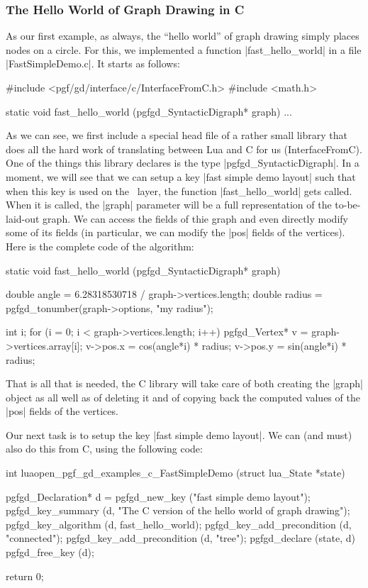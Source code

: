 \subsubsection{The Hello World of Graph Drawing in C}

As our first example, as always, the ``hello world'' of graph drawing
simply places nodes on a circle. For this, we implemented a
function |fast_hello_world| in a file |FastSimpleDemo.c|. It starts as
follows:

\begin{codeexample}
#include <pgf/gd/interface/c/InterfaceFromC.h>
#include <math.h>

static void fast_hello_world (pgfgd_SyntacticDigraph* graph) {
  ...
}
\end{codeexample}

As we can see, we first include a special head file of a rather small
library that does all the hard work of translating between Lua and C
for us (InterfaceFromC). One of the things this library declares is
the type |pgfgd_SyntacticDigraph|. In a moment, we will see that we
can setup a key |fast simple demo layout| such that when this key is
used on the \tikzname\ layer, the function |fast_hello_world| gets
called. When it is called, the |graph| parameter will be a full
representation of the to-be-laid-out graph. We can access the fields
of thie graph and even directly modify some of its fields (in
particular, we can modify the |pos| fields of the vertices). Here is
the complete code of the algorithm:

\begin{codeexample}
static void fast_hello_world (pgfgd_SyntacticDigraph* graph) {
  double angle  = 6.28318530718 / graph->vertices.length;
  double radius = pgfgd_tonumber(graph->options, "my radius");
  
  int i;
  for (i = 0; i < graph->vertices.length; i++) {
    pgfgd_Vertex* v = graph->vertices.array[i];
    v->pos.x = cos(angle*i) * radius;
    v->pos.y = sin(angle*i) * radius;
  }
}
\end{codeexample}

That is all that is needed, the C library will take care of both
creating the |graph| object as all well as of deleting it and of
copying back the computed values of the |pos| fields of the vertices.

Our next task is to setup the key |fast simple demo layout|. We can
(and must) also do this from C, using the following code:

\begin{codeexample}
int luaopen_pgf_gd_examples_c_FastSimpleDemo (struct lua_State *state) {
  
  pgfgd_Declaration* d = pgfgd_new_key ("fast simple demo layout");
  pgfgd_key_summary          (d, "The C version of the hello world of graph drawing");
  pgfgd_key_algorithm        (d, fast_hello_world);
  pgfgd_key_add_precondition (d, "connected");
  pgfgd_key_add_precondition (d, "tree");
  pgfgd_declare              (state, d)
  pgfgd_free_key             (d);
  
  return 0;
}
\end{codeexample}

